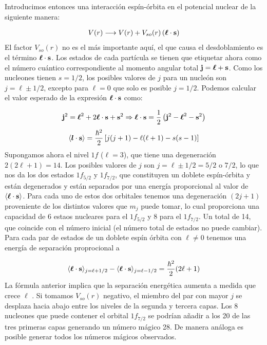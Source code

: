 Introducimos entonces una interacción espín-órbita en el potencial nuclear de la siguiente manera:

\begin{eqnarray}
    V(r) \longrightarrow V(r) + V_{so} (r) \left( \boldsymbol{\ell} \cdot \mathbf{s} \right)
\end{eqnarray}
El factor $V_{so} (r)$ no es el más importante aquí, el que causa el desdoblamiento es el término $\boldsymbol{\ell}\cdot\mathbf{s}$. Los estados de cada partícula se tienen que etiquetar ahora como el número cuántico correspondiente al momento angular total $\mathbf{j} =\boldsymbol{\ell}+\mathbf{s}$. Como los nucleones tienen $s=1/2$, los posibles valores de $j$ para un nucleón son $j=\ell\pm 1/2$, excepto para $\ell=0$ que solo es posible $j=1/2$. Podemos calcular el valor esperado de la expresión $\boldsymbol{\ell} \cdot \mathbf{s}$ como:

\begin{eqnarray}
    \mathbf{j}^2 = \boldsymbol{\ell}^2 + 2 \boldsymbol{\ell}\cdot\mathbf{s} + \mathbf{s}^2 \Rightarrow \boldsymbol{\ell} \cdot \mathbf{s} = \frac{1}{2} \left( \mathbf{j}^2 -\boldsymbol{\ell}^2 -\mathbf{s}^2 \right)     
\end{eqnarray}
\begin{eqnarray}
    \langle \boldsymbol{l} \cdot \mathbf{s} \rangle = \frac{\hbar^2}{2} \left[ j(j+1)-\ell(\ell+1) - s(s-1) \right]
\end{eqnarray}
Supongamos ahora el nivel $1f$ ($\ell = 3$), que tiene una degeneración $2(2\ell+1)=14$. Los posibles valores de $j$ son $j=\ell \pm 1/2=5/2$ o $7/2$, lo que nos da los dos estados $1f_{5/2}$ y $1f_{7/2}$, que constituyen un doblete espín-órbita y están degenerados y están separados por una energía proporcional al valor de $\langle \boldsymbol{\ell} \cdot \mathbf{s} \rangle$. Para cada uno de estos dos orbitales tenemos una degeneración $(2j+1)$ proveniente de los distintos valores que $m_j$ puede tomar, lo cual proporciona una capacidad de 6 estaos nucleares para el $1f_{5/2}$ y 8 para el $1f_{7/2}$. Un total de 14, que coincide con el número inicial (el número total de estados no puede cambiar). Para cada par de estados de un doblete espín órbita con $\ell \neq 0$ tenemos una energía de separación proprocional a

\begin{eqnarray}
	\langle \boldsymbol{\ell} \cdot \mathbf{s} \rangle_{j=\ell+1/2} - \langle \boldsymbol{\ell} \cdot \mathbf{s} \rangle_{j=\ell-1/2} = \frac{\hbar^2}{2} (2\ell +1)
\end{eqnarray}
La fórmula anterior implica que la separación energética aumenta a medida que crece $\ell$ . Si tomamos $V_{so} (r)$ negativo, el miembro del par con mayor $j$ se desplaza hacia abajo entre los niveles de la segunda y tercera capas. Los 8 nucleones que puede contener el orbital $1f_{7/2}$ se podrían añadir a los 20 de las tres primeras capas generando un número mágico 28. De manera análoga es posible generar todos los números mágicos observados. \\



